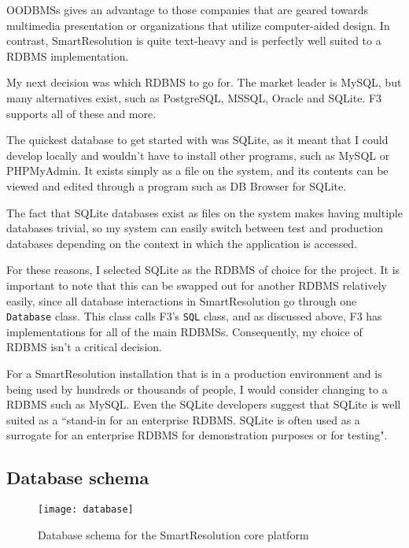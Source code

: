 OODBMSs gives an advantage to those companies that are geared towards multimedia presentation or organizations that utilize computer-aided design. In contrast, SmartResolution is quite text-heavy and is perfectly well suited to a RDBMS implementation.~\cite{oodbms}

My next decision was which RDBMS to go for. The market leader is MySQL, but many alternatives exist, such as PostgreSQL, MSSQL, Oracle and SQLite. F3 supports all of these and more.~\cite{f3:sqlConstructor}

The quickest database to get started with was SQLite, as it meant that I could develop locally and wouldn't have to install other programs, such as MySQL or PHPMyAdmin. It exists simply as a file on the system, and its contents can be viewed and edited through a program such as DB Browser for SQLite.

The fact that SQLite databases exist as files on the system makes having multiple databases trivial, so my system can easily switch between test and production databases depending on the context in which the application is accessed.

For these reasons, I selected SQLite as the RDBMS of choice for the project. It is important to note that this can be swapped out for another RDBMS relatively easily, since all database interactions in SmartResolution go through one \lstinline{Database} class. This class calls F3's \lstinline{SQL} class, and as discussed above, F3 has implementations for all of the main RDBMSs. Consequently, my choice of RDBMS isn't a critical decision.

For a SmartResolution installation that is in a production environment and is being used by hundreds or thousands of people, I would consider changing to a RDBMS such as MySQL. Even the SQLite developers suggest that SQLite is well suited as a ``stand-in for an enterprise RDBMS. SQLite is often used as a surrogate for an enterprise RDBMS for demonstration purposes or for testing".~\cite{sqliteFeatures}

\subsection{Database schema}

\begin{figure}[h!]
  \centering
    \ifimages
    \texttt{[image: database]}
    \fi
  \caption{Database schema for the SmartResolution core platform}
  \label{uml:databaseSchema}
\end{figure}

